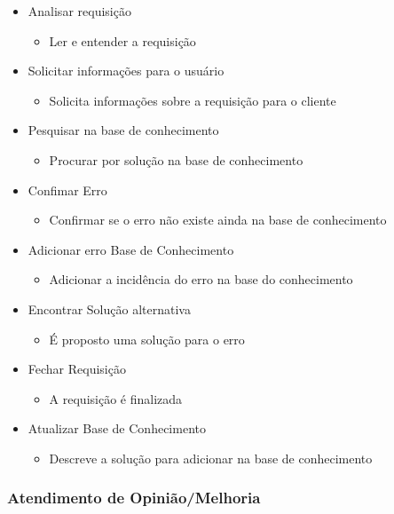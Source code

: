 \begin{itemize}[noitemsep]
	\item Analisar requisição
	\begin{itemize}
		\item Ler e entender a requisição
	\end{itemize}
	\item Solicitar informações para o usuário
	\begin{itemize}
		\item Solicita informações sobre a requisição para o cliente
	\end{itemize}
	\item Pesquisar na base de conhecimento
		\begin{itemize}
			\item Procurar por solução na base de conhecimento
		\end{itemize}
	\item Confimar Erro
		\begin{itemize}
			\item Confirmar se o erro não existe ainda na base de conhecimento
		\end{itemize}
	\item Adicionar erro Base de Conhecimento
		\begin{itemize}
			\item Adicionar a incidência do erro na base do conhecimento
		\end{itemize}
	\item Encontrar Solução alternativa
		\begin{itemize}
			\item É proposto uma solução para o erro
		\end{itemize}
	\item Fechar Requisição
		\begin{itemize}
			\item A requisição é finalizada
		\end{itemize}
	\item Atualizar Base de Conhecimento
	\begin{itemize}
		\item Descreve a solução para adicionar na base de conhecimento
	\end{itemize}
\end{itemize}


\subsubsection{Atendimento de Opinião/Melhoria}

